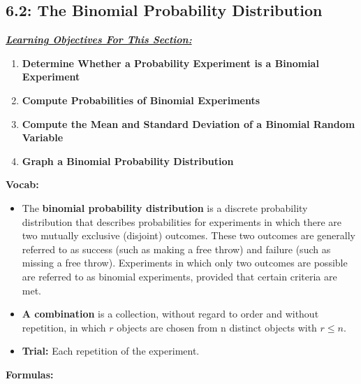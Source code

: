 \documentclass{report}
\begin{document}
        \subsection*{6.2: The Binomial Probability Distribution}
      \bigbreak \noindent 
      \textbf{\textit{\underline{Learning Objectives For This Section:}}}
      \begin{enumerate}
            \item \textbf{Determine Whether a Probability Experiment is a Binomial Experiment}
          \item \textbf{Compute Probabilities of Binomial Experiments}
          \item \textbf{Compute the Mean and Standard Deviation of a Binomial Random Variable}
          \item \textbf{Graph a Binomial Probability Distribution}
      \end{enumerate}
      \bigbreak \noindent 
      \textbf{Vocab:}
      \begin{itemize}
          \item The \textbf{binomial probability distribution} is a discrete probability distribution that describes probabilities for experiments in which there are two mutually exclusive (disjoint) outcomes. These two outcomes are generally referred to as success (such as making a free throw) and failure (such as missing a free throw). Experiments in which only two outcomes are possible are referred to as binomial experiments, provided that certain criteria are met.
          \item \textbf{A combination} is a collection, without regard to order and without repetition, in which  $r $  objects are chosen from  n  distinct objects with  $r \leq n $.
        \item \textbf{Trial:} Each repetition of the experiment. 
      \end{itemize}
      \bigbreak \noindent 
      \textbf{Formulas:}
\end{document}
